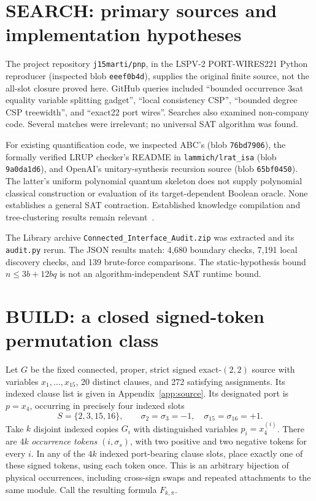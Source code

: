 \documentclass[11pt]{article}
\begin{document}
\section{SEARCH: primary sources and implementation hypotheses}
The project repository \texttt{j15marti/pnp}, in the LSPV-2 PORT-WIRES221 Python reproducer (inspected blob \texttt{eeef0b4d}), supplies the original finite source, not the all-slot closure proved here. GitHub queries included ``bounded occurrence 3sat equality variable splitting gadget'', ``local consistency CSP'', ``bounded degree CSP treewidth'', and ``exact22 port wires''. Searches also examined non-company code. Several matches were irrelevant; no universal SAT algorithm was found.

For existing quantification code, we inspected ABC's  (blob \texttt{76bd7906}), the formally verified LRUP checker's README in \texttt{lammich/lrat\_isa} (blob \texttt{9a0da1d6}), and OpenAI's unitary-synthesis recursion source  (blob \texttt{65bf0450}). The latter's uniform polynomial quantum skeleton does not supply polynomial classical construction or evaluation of its target-dependent Boolean oracle. None establishes a general SAT contraction. Established knowledge compilation and tree-clustering results remain relevant~\cite{dechter1989,darwiche2002}.

The Library archive \texttt{Connected\_Interface\_Audit.zip} was extracted and its \texttt{audit.py} rerun. The JSON results match: 4,680 boundary checks, 7,191 local discovery checks, and 139 brute-force comparisons. The static-hypothesis bound $n\le3b+12bq$ is not an algorithm-independent SAT runtime bound.

\section{BUILD: a closed signed-token permutation class}
Let $G$ be the fixed connected, proper, strict signed exact-$(2,2)$ source with variables $x_1,\ldots,x_{15}$, 20 distinct clauses, and 272 satisfying assignments. Its indexed clause list is given in Appendix~\ref{app:source}. Its designated port is $p=x_4$, occurring in precisely four indexed slots
\[
 S=\{2,3,15,16\},\qquad \sigma_2=\sigma_3=-1,\quad \sigma_{15}=\sigma_{16}=+1.
\]
Take $k$ disjoint indexed copies $G_i$ with distinguished variables $p_i=x_4^{(i)}$. There are $4k$ \emph{occurrence tokens} $(i,\sigma_s)$, with two positive and two negative tokens for every $i$. In any of the $4k$ indexed port-bearing clause slots, place exactly one of these signed tokens, using each token once. This is an arbitrary bijection of physical occurrences, including cross-sign swaps and repeated attachments to the same module. Call the resulting formula $F_{k,\pi}$.
\end{document}
